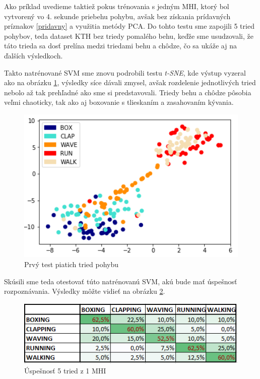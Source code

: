 Ako príklad uvedieme taktiež pokus trénovania s jedným MHI, ktorý bol vytvorený vo 4. sekunde priebehu pohybu, avšak bez získania prídavných príznakov \ref{pridavny} a využitia metódy PCA.  Do tohto testu sme zapojili 5 tried pohybov, teda dataset KTH bez triedy pomalého behu, keďže sme usudzovali, že táto trieda sa dosť prelína medzi triedami behu a chôdze, čo sa ukáže aj na ďalších výsledkoch. 

Takto natrénované SVM sme znovu podrobili testu \textit{t-SNE}, kde výstup vyzeral ako na obrázku \ref{Test5Class1}, výsledky síce dávali zmysel, avšak rozdelenie jednotlivých tried nebolo až tak prehľadné ako sme si predstavovali. Triedy behu a chôdze pôsobia veľmi chaoticky, tak ako aj boxovanie s tlieskaním a zasahovaním kývania.

\begin{figure}[H]
  \centering
  \includegraphics[width=14cm]{img/test5classes1.png}
  \caption{Prvý test piatich tried pohybu}
  \label{Test5Class1}
\end{figure}

Skúsili sme teda otestovať túto natrénovanú SVM, akú bude mať úspešnosť rozpoznávania. Výsledky môžte vidieť na obrázku \ref{Test5Class1g}.


\begin{figure}[H]
  \centering
  \includegraphics[width=14cm]{img/test5classes1tab.png}
  \caption{Úspešnosť 5 tried z 1 MHI}
  \label{Test5Class1g}
\end{figure}

